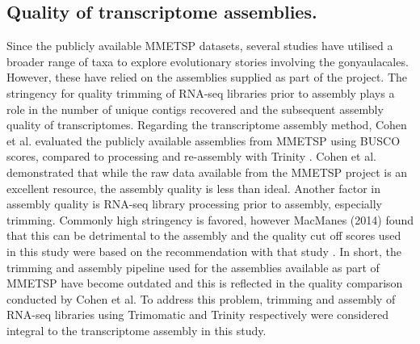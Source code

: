 \documentclass[12pt]{article}
\begin{document}
\subsection*{Quality of transcriptome assemblies.}
Since the publicly available MMETSP datasets, several studies have utilised a broader range of taxa to explore evolutionary stories involving the gonyaulacales. 
However, these have relied on the assemblies supplied as part of the project. 
The stringency for quality trimming of RNA-seq libraries prior to assembly plays a role in the number of unique contigs recovered and the subsequent assembly quality of transcriptomes. 
Regarding the transcriptome assembly method, Cohen et al. evaluated the publicly available assemblies from MMETSP using BUSCO scores, compared to processing and re-assembly with Trinity \cite{cohen-reass}. 
Cohen et al. demonstrated that while the raw data available from the MMETSP project is an excellent resource, the assembly quality is less than ideal. 
Another factor in assembly quality is RNA-seq library processing prior to assembly, especially trimming. 
Commonly high stringency is favored, however MacManes (2014) found that this can be detrimental to the assembly and the quality cut off scores used in this study were based on the recommendation with that study \cite{macmanes2014optimal}.
In short, the trimming and assembly pipeline used for the assemblies available as part of MMETSP have become outdated and this is reflected in the quality comparison conducted by Cohen et al. 
To address this problem, trimming and assembly of RNA-seq libraries using Trimomatic and Trinity respectively were considered integral to the transcriptome assembly in this study.
\end{document}
